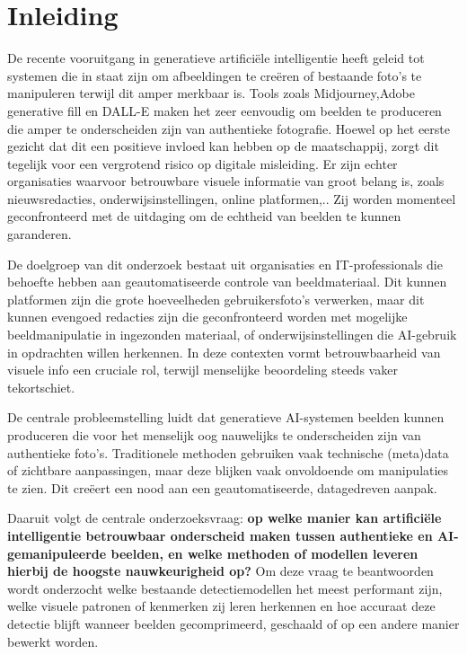 \documentclass{hogent-article}
\begin{document}
\section{Inleiding}%
\label{sec:inleiding}
De recente vooruitgang in generatieve artificiële intelligentie heeft geleid tot systemen die in staat zijn om afbeeldingen te creëren of bestaande foto's te manipuleren terwijl dit amper merkbaar is. Tools zoals Midjourney,Adobe generative fill en DALL-E maken het zeer eenvoudig om beelden te produceren die amper te onderscheiden zijn van authentieke fotografie. Hoewel op het eerste gezicht dat dit een positieve invloed kan hebben op de maatschappij, zorgt dit tegelijk voor een vergrotend risico op digitale misleiding. Er zijn echter organisaties waarvoor betrouwbare visuele informatie van groot belang is, zoals nieuwsredacties, onderwijsinstellingen, online platformen,.. Zij worden momenteel geconfronteerd met de uitdaging om de echtheid van beelden te kunnen garanderen.

De doelgroep van dit onderzoek bestaat uit organisaties en IT-professionals die behoefte hebben aan geautomatiseerde controle van beeldmateriaal. Dit kunnen platformen zijn die grote hoeveelheden gebruikersfoto's verwerken, maar dit kunnen evengoed redacties zijn die geconfronteerd worden met mogelijke beeldmanipulatie in ingezonden materiaal, of onderwijsinstellingen die AI-gebruik in opdrachten willen herkennen. In deze contexten vormt betrouwbaarheid van visuele info een cruciale rol, terwijl menselijke beoordeling steeds vaker tekortschiet.

De centrale probleemstelling luidt dat generatieve AI-systemen beelden kunnen produceren die voor het menselijk oog nauwelijks te onderscheiden zijn van authentieke foto's. Traditionele methoden gebruiken vaak technische (meta)data of zichtbare aanpassingen, maar deze blijken vaak onvoldoende om manipulaties te zien. Dit creëert een nood aan een geautomatiseerde, datagedreven aanpak.

Daaruit volgt de centrale onderzoeksvraag: \textbf{op welke manier kan artificiële intelligentie betrouwbaar onderscheid maken tussen authentieke en AI-gemanipuleerde beelden, en welke methoden of modellen leveren hierbij de hoogste nauwkeurigheid op?} Om deze vraag te beantwoorden wordt onderzocht welke bestaande detectiemodellen het meest performant zijn, welke visuele patronen of kenmerken zij leren herkennen en hoe accuraat deze detectie blijft wanneer beelden gecomprimeerd, geschaald of op een andere manier bewerkt worden.
\end{document}
